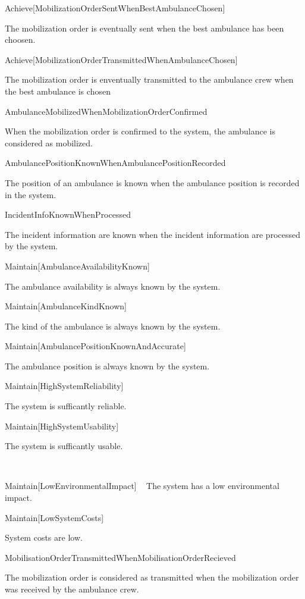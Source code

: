 Achieve[MobilizationOrderSentWhenBestAmbulanceChosen]

The mobilization order is eventually sent when the best ambulance has been choosen.


Achieve[MobilizationOrderTransmittedWhenAmbulanceChosen]

The mobilization order is enventually transmitted to the ambulance crew when the best ambulance is chosen


AmbulanceMobilizedWhenMobilizationOrderConfirmed

When the mobilization order is confirmed to the system, the ambulance is considered as mobilized. 


AmbulancePositionKnownWhenAmbulancePositionRecorded

The position of an ambulance is known when the ambulance position is recorded in the system.


IncidentInfoKnownWhenProcessed

The incident information are known when the incident information are processed by the system.


Maintain[AmbulanceAvailabilityKnown]

The ambulance availability is always known by the system.


Maintain[AmbulanceKindKnown]

The kind of the ambulance is always known by the system.


Maintain[AmbulancePositionKnownAndAccurate]

The ambulance position is always known by the system.


Maintain[HighSystemReliability]

The system is sufficantly reliable.
 

Maintain[HighSystemUsability]

The system is sufficantly usable.

 

Maintain[LowEnvironmentalImpact]
 
The system has a low environmental impact.


Maintain[LowSystemCosts]

System costs are low.
 

MobilisationOrderTransmittedWhenMobilisationOrderRecieved

The mobilization order is considered as transmitted when the mobilization order was received by the ambulance crew.

